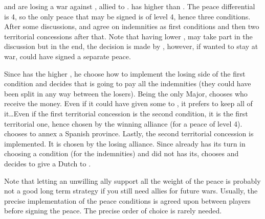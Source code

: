 \begin{exemple}[Disagreement]
  \HIS and \HOL are losing a war against \FRA, allied to \paysPortugal. \HOL
  has higher \DIP than \HIS. The peace differential is 4, so the only peace
  that may be signed is of level 4, hence three conditions. After some
  discussions, \FRA and \HOL agree on indemnities as first conditions and then
  two territorial concessions after that. Note that having lower \DIP, \HIS
  may take part in the discussion but in the end, the decision is made by
  \HOL, however, if \HOL wanted to stay at war, \HIS could have signed a
  separate peace.

  Since \HOL has the higher \DIP, he choose how to implement the losing side
  of the first condition and decides that \HIS is going to pay all the
  indemnities (they could have been split in any way between the
  losers). Being the only Major, \FRA chooses who receive the money. Even if
  it could have given some to \paysPortugal, it prefers to keep all of
  it\ldots Even if the first territorial concession is the second condition,
  it is the first territorial one, hence chosen by the winning alliance (for a
  peace of level 4). \FRA chooses to annex a Spanish province. Lastly, the
  second territorial concession is implemented. It is chosen by the losing
  alliance. Since \HOL already has its turn in choosing a condition (for the
  indemnities) and \HIS did not has its, \HIS chooses and decides to give a
  Dutch \COL to \paysPortugal.

  Note that letting an unwilling ally support all the weight of the peace is
  probably not a good long term strategy if you still need allies for future
  wars. Usually, the precise implementation of the peace conditions is agreed
  upon between players before signing the peace. The precise order of choice
  is rarely needed.
\end{exemple}

